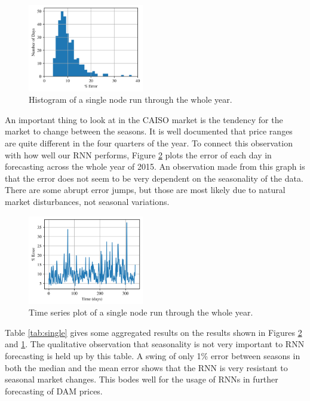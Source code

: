 \documentclass[sigconf]{acmart}
\begin{document}
\begin{figure}[h]
\includegraphics[width=0.45\textwidth]{fig_7.png}
\caption{Histogram of a single node run through the whole year.}
\label{fig:hist_single}
\end{figure}

An important thing to look at in the CAISO market is the tendency for the market to change between the seasons. It is well documented that price ranges are quite different in the four quarters of the year. To connect this observation with how well our RNN performs, Figure \ref{fig:time_single} plots the error of each day in forecasting across the whole year of 2015. An observation made from this graph is that the error does not seem to be very dependent on the seasonality of the data. There are some abrupt error jumps, but those are most likely due to natural market disturbances, not seasonal variations. 

\begin{figure}[h]
\includegraphics[width=0.45\textwidth]{fig_8.png}
\caption{Time series plot of a single node run through the whole year.}
\label{fig:time_single}
\end{figure}

Table \ref{tab:single} gives some aggregated results on the results shown in Figures \ref{fig:time_single} and \ref{fig:hist_single}. The qualitative observation that seasonality is not very important to RNN forecasting is held up by this table. A swing of only 1\% error between seasons in both the median and the mean error shows that the RNN is very resistant to seasonal market changes. This bodes well for the usage of RNNs in further forecasting of DAM prices. 
\end{document}
